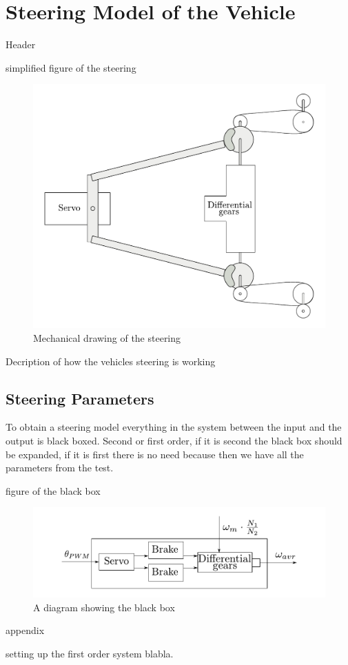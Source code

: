 \section{Steering Model of the Vehicle}\label{sec:SteeringModel}
Header

simplified figure of the steering
 \begin{figure}[H]
 	\centering
 	\includegraphics[scale=0.6]{figures/steeringMechanical.pdf}
 	\caption{Mechanical drawing of the steering}
 	\label{steeringMechanical}
 \end{figure}

Decription of how the vehicles steering is working

\subsection{Steering Parameters}
 To obtain a steering model everything in the system between the input and the output is black boxed. Second or first order, if it is second the black box should be expanded, if it is first there is no need because then we have all the parameters from the test.
 
 figure of the black box
 \begin{figure}[H]
 	\centering
 	\includegraphics[scale=1]{figures/steeringDiagramBlackBox.pdf}
 	\caption{A diagram showing the black box}
 	\label{steeringDiagramBlackBox}
 \end{figure}
 
 appendix
 
setting up the first order system blabla. 
